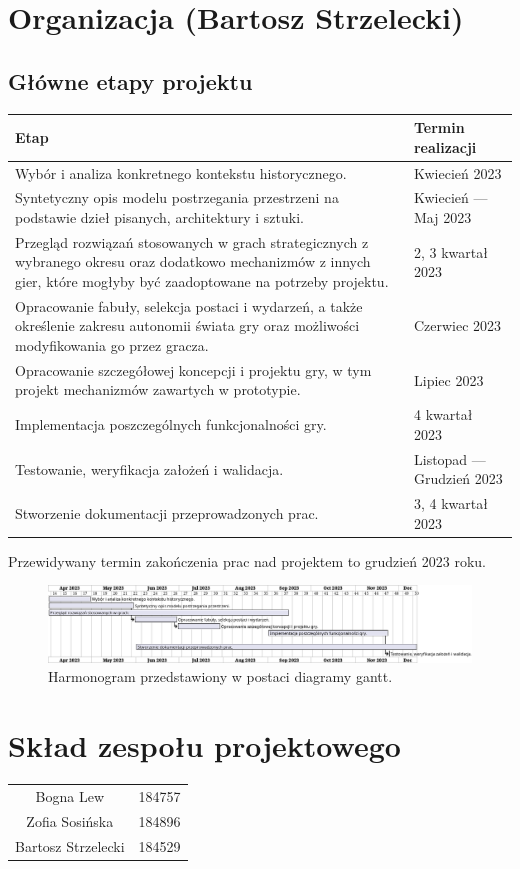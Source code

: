 \section{Organizacja (Bartosz Strzelecki)}
\subsection{Główne etapy projektu}
\begin{center}
  \begin{tabular}{| m{30em} | m{12em}|} 
  \hline
  Etap & Termin realizacji \\
  \hline\hline
  Wybór i analiza konkretnego kontekstu historycznego. & Kwiecień 2023 \\
  \hline
  Syntetyczny opis modelu postrzegania przestrzeni na podstawie dzieł pisanych, architektury i sztuki. & Kwiecień — Maj 2023 \\
  \hline
  Przegląd rozwiązań stosowanych w grach strategicznych z wybranego okresu oraz dodatkowo mechanizmów z innych gier, które mogłyby być zaadoptowane na potrzeby projektu. & 2, 3 kwartał 2023 \\
  \hline
  Opracowanie fabuły, selekcja postaci i wydarzeń, a także określenie zakresu autonomii świata gry oraz możliwości modyfikowania go przez gracza. & Czerwiec 2023 \\
  \hline
  Opracowanie szczegółowej koncepcji i projektu gry, w tym projekt mechanizmów zawartych w prototypie. & Lipiec 2023 \\
  \hline
  Implementacja poszczególnych funkcjonalności gry. & 4 kwartał 2023 \\ 
  \hline
  Testowanie, weryfikacja założeń i walidacja. & Listopad — Grudzień 2023 \\
  \hline
  Stworzenie dokumentacji przeprowadzonych prac. & 3, 4 kwartał 2023 \\
  \hline
\end{tabular}
\end{center}
Przewidywany termin zakończenia prac nad projektem to grudzień 2023 roku.
\begin{figure}[htbp]
    \centering
    \includegraphics[width=1\textwidth]{uml/Harmonogram}
    \caption{Harmonogram przedstawiony w postaci diagramy gantt.}
\end{figure}
\section{Skład zespołu projektowego}
\begin{center}
  \begin{tabular}{ c c }
    Bogna Lew & 184757 \\
    Zofia Sosińska & 184896 \\
    Bartosz Strzelecki & 184529
  \end{tabular}
\end{center}
